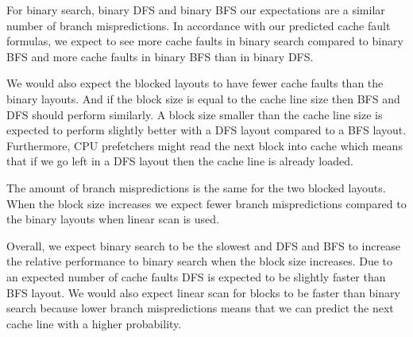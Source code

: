 For binary search, binary DFS and binary BFS our expectations are a similar number of branch mispredictions. In accordance with our predicted cache fault formulas, we expect to see more cache faults in binary search compared to binary BFS and more cache faults in binary BFS than in binary DFS.

We would also expect the blocked layouts to have fewer cache faults than the binary layouts. And if the block size is equal to the cache line size then BFS and DFS should perform similarly. A block size smaller than the cache line size is expected to perform slightly better with a DFS layout compared to a BFS layout. Furthermore, CPU prefetchers might read the next block into cache which means that if we go left in a DFS layout then the cache line is already loaded.

The amount of branch mispredictions is the same for the two blocked layouts. When the block size increases we expect fewer branch mispredictions compared to the binary layouts when linear scan is used.

Overall, we expect binary search to be the slowest and DFS and BFS to increase the relative performance to binary search when the block size increases. Due to an expected number of cache faults DFS is expected to be slightly faster than BFS layout. We would also expect linear scan for blocks to be faster than binary search because lower branch mispredictions means that we can predict the next cache line with a higher probability.